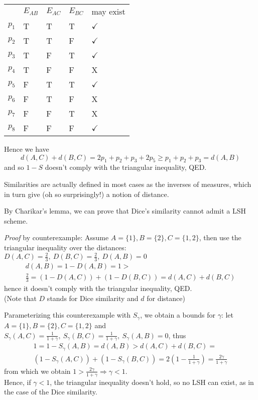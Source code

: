 	\begin{tabular}{lllll}
		& $E_{AB}$ & $E_{AC}$ & $E_{BC}$ & may exist             \\
		$p_1$ & T         & T         & T         & $\checkmark$ \\
		$p_2$ & T         & T         & F         & $\checkmark$ \\
		$p_3$ & T         & F         & T         & $\checkmark$ \\
		$p_4$ & T         & F         & F         & X            \\
		$p_5$ & F         & T         & T         & $\checkmark$ \\
		$p_6$ & F         & T         & F         & X            \\
		$p_7$ & F         & F         & T         & X            \\
		$p_8$ & F         & F         & F         & $\checkmark$
	\end{tabular}

	\noindent Hence we have
	\begin{equation*}
		d(A,C) + d(B,C) = 2p_1 + p_2 + p_3 + 2p_5 \geq p_1 + p_2 + p_3 = d(A,B)
	\end{equation*}
	and so $1-S$ doesn't comply with the triangular inequality, QED.
	
	\obs Similarities are actually defined in most cases as the inverses of measures, which in turn give (oh so surprisingly!) a notion of distance.
	
	\cor By Charikar's lemma, we can prove that Dice's similarity cannot admit a LSH scheme.
	
	\textit{Proof} by counterexample: Assume $A=\{1\}, B=\{2\}, C=\{1, 2\}$, then use the triangular inequality over the distances: \\
	$D(A,C)=\frac{2}{3},\ D(B,C)=\frac{2}{3},\ D(A,B)=0$
	\begin{multline*}
		d(A,B) = 1- D(A,B) = 1 > \\
		\frac{2}{3} = (1-D(A,C)) + (1-D(B,C)) = d(A,C) + d(B,C)
	\end{multline*}
	hence it doesn't comply with the triangular inequality, QED.\\
	(Note that $D$ stands for Dice similarity and $d$ for distance)
	
	\obs Parameterizing this counterexample with $S_\gamma$, we obtain a bounds for $\gamma$: let $A=\{1\}, B=\{2\}, C=\{1, 2\}$ and \\
	$S_\gamma(A,C)=\frac{1}{1+\gamma},\ S_\gamma(B,C)=\frac{1}{1+\gamma},\ S_\gamma(A,B)=0$, thus
	\begin{multline*}
		1=1-S_\gamma(A,B)=d(A,B) > d(A,C) + d(B,C) = \\
		(1-S_\gamma(A,C)) + (1-S_\gamma(B,C)) = 2 \left( 1- \frac{1}{1+\gamma} \right) = \frac{2\gamma}{1 + \gamma}
	\end{multline*}
	from which we obtain
	$1 > \frac{2\gamma}{1 + \gamma} \Rightarrow \gamma < 1$. \\
	Hence, if $\gamma < 1$, the triangular inequality doesn't hold, so no LSH can exist, as in the case of the Dice similarity.
	
